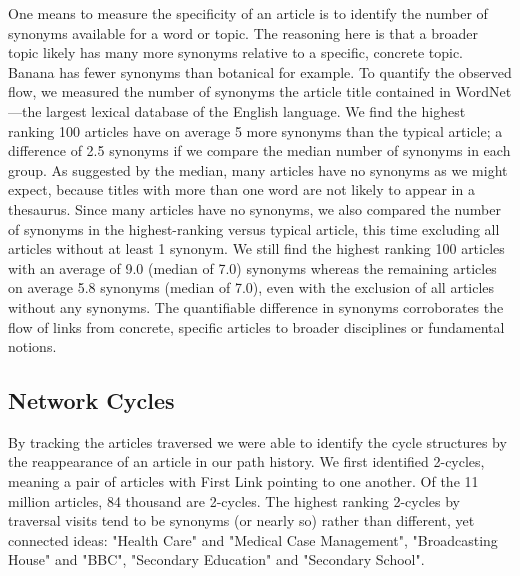 \documentclass[twoside]{article}
\begin{document}
One means to measure the specificity of an article is to identify the number of synonyms available for a word or topic. The reasoning here is that a  broader topic likely has many more synonyms relative to a specific, concrete topic. Banana has fewer synonyms than botanical for example. To quantify the observed flow, we measured the number of synonyms the article title contained in WordNet---the largest lexical database of the English language. We find the highest ranking 100 articles have on average 5 more synonyms than the typical article; a difference of 2.5 synonyms if we compare the median number of synonyms in each group. As suggested by the median, many articles have no synonyms as we might expect, because titles with more than one word are not likely to appear in a thesaurus. Since many articles have no synonyms, we also compared the number of synonyms in the highest-ranking versus typical article, this time excluding all articles without at least 1 synonym. We still find the highest ranking 100 articles with an average of 9.0 (median of 7.0) synonyms whereas the remaining articles on average 5.8 synonyms (median of 7.0), even with the exclusion of all articles without any synonyms.
The quantifiable difference in synonyms corroborates the flow of links from concrete, specific articles to broader disciplines or fundamental notions.



\subsection{Network Cycles}
By tracking the articles traversed we were able to identify the cycle structures
by the reappearance of an article in our path history.
We first identified 2-cycles, meaning a pair of articles with First Link pointing to one another.
Of the 11 million articles, 84 thousand are 2-cycles. 
The highest ranking 2-cycles by traversal visits tend to be synonyms (or nearly so) rather than different, yet connected ideas:
"Health Care" and "Medical Case Management", "Broadcasting House" and "BBC", "Secondary Education" and "Secondary School".
\end{document}
